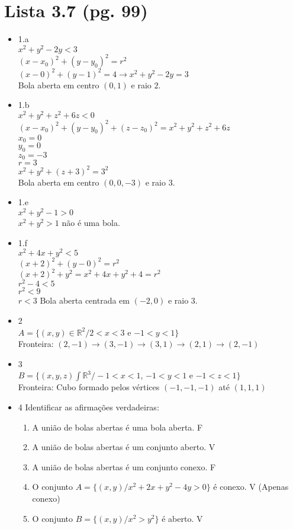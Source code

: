 \documentclass{article}
\begin{document}
\section*{Lista 3.7 (pg. 99)}
	\begin{itemize}
		\item 1.a
		\\$x^2+y^2-2y<3$
		\\$(x-x_0)^2+(y-y_0)^2 = r^2$
		\\$(x-0)^2+(y-1)^2 = 4 \to x^2+y^2-2y=3$
		\\Bola aberta em centro $(0,1)$ e raio $2$.
		\item 1.b
		\\$x^2+y^2+z^2+6z<0$
		\\$(x-x_0)^2+(y-y_0)^2+(z-z_0)^2 = x^2+y^2+z^2+6z$
		\\$x_0 = 0$
		\\$y_0 = 0$
		\\$z_0 = -3$
		\\$r = 3$
		\\$x^2+y^2+(z+3)^2=3^2$
		\\Bola aberta em centro $(0,0,-3)$ e raio $3$.
		\item 1.e
		\\$x^2+y^2-1>0$
		\\$x^2+y^2>1$ não é uma bola.
		\item 1.f
		\\$x^2+4x+y^2<5$
		\\$(x+2)^2+(y-0)^2=r^2$
		\\$(x+2)^2+y^2=x^2+4x+y^2+4=r^2$
		\\$r^2-4<5$
		\\$r^2<9$
		\\$r<3$
		Bola aberta centrada em $(-2,0)$ e raio $3$.
		\item 2
		\\$A = \{(x,y) \in \mathbb{R}^2 / 2<x<3$ e $-1<y<1\}$
		\\Fronteira: $(2,-1)\to (3,-1) \to (3,1) \to (2,1) \to (2,-1)$
		\item 3
		\\$B=\{(x,y,z)\int \mathbb{R}^3/-1<x<1$, $-1<y<1$ e $-1<z<1\}$
		\\Fronteira: Cubo formado pelos vértices $(-1,-1,-1)$ até $(1,1,1)$
		\item 4 Identificar as afirmações verdadeiras:
			\begin{enumerate}
				\item A união de bolas abertas é uma bola aberta. F
				\item A união de bolas abertas é um conjunto aberto. V
				\item A união de bolas abertas é um conjunto conexo. F
				\item O conjunto $A = \{(x,y)/x^2+2x+y^2-4y>0\}$ é conexo. V (Apenas conexo)
				\item O conjunto $B = \{(x,y)/x^2>y^2\}$ é aberto. V
			\end{enumerate}
			

\end{itemize}
\end{document}
